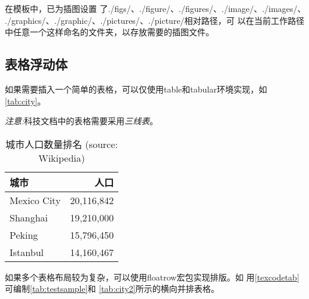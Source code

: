 \documentclass[
  ]{nwafuprojrep}
\begin{document}
\begin{figure}[!htp]
\end{figure}

在模板中，已为插图设置
了{{./figs/}、{./figure/}、{./figures/}、{./image/}、{./images/}、
  {./graphics/}、{./graphic/}、{./pictures/}、{./picture/}}相对路径，可
以在当前工作路径中任意一个这样命名的文件夹，以存放需要的插图文件。

\subsection{表格浮动体}
如果需要插入一个简单的表格，可以仅使用{table}和{tabular}环境实现，如%
\autoref{tab:city}。

\emph{注意:}科技文档中的表格需要采用\emph{三线表}。

\begin{table}[!htb]
  \caption[城市人口]{城市人口数量排名 (source: Wikipedia)\label{tab:city}}
  \begin{tabular}{lr}
    \toprule
    城市 & 人口 \\
    \midrule
    Mexico City & 20,116,842\\
    Shanghai & 19,210,000\\
    Peking & 15,796,450\\
    Istanbul & 14,160,467\\
    \bottomrule
  \end{tabular}
\end{table}

如果多个表格布局较为复杂，可以使用floatrow宏包实现排版。如%
用\autoref{texcodetab}可编制\autoref{tab:testsample}和%
\autoref{tab:city2}所示的横向并排表格。%
\end{document}
